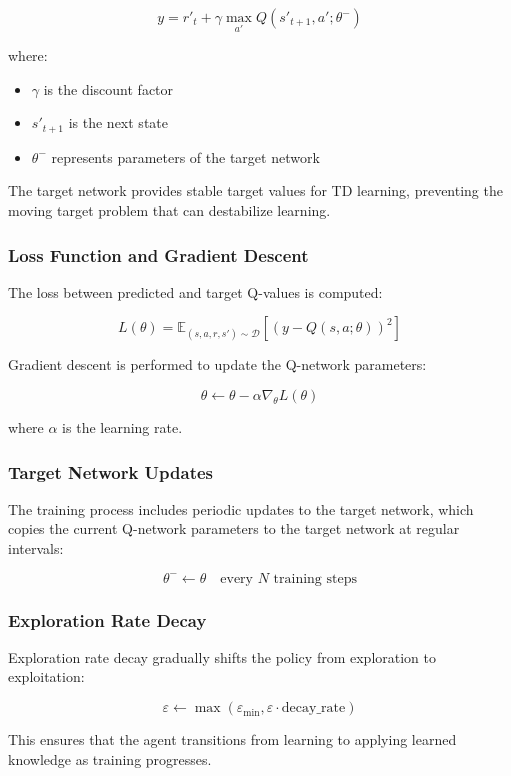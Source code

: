 \documentclass[11pt,a4paper]{article}
\begin{document}
\[
y = r'_t + \gamma \max_{a'} Q(s'_{t+1}, a'; \theta^-)
\]

where:
\begin{itemize}
    \item $\gamma$ is the discount factor
    \item $s'_{t+1}$ is the next state
    \item $\theta^-$ represents parameters of the target network
\end{itemize}

The target network provides stable target values for TD learning, preventing the moving target problem that can destabilize learning.

\subsubsection{Loss Function and Gradient Descent}

The loss between predicted and target Q-values is computed:

\[
L(\theta) = \mathbb{E}_{(s,a,r,s') \sim \mathcal{D}} \left[ \left( y - Q(s, a; \theta) \right)^2 \right]
\]

Gradient descent is performed to update the Q-network parameters:

\[
\theta \leftarrow \theta - \alpha \nabla_\theta L(\theta)
\]

where $\alpha$ is the learning rate.

\subsubsection{Target Network Updates}

The training process includes periodic updates to the target network, which copies the current Q-network parameters to the target network at regular intervals:

\[
\theta^- \leftarrow \theta \quad \text{every } N \text{ training steps}
\]

\subsubsection{Exploration Rate Decay}

Exploration rate decay gradually shifts the policy from exploration to exploitation:

\[
\varepsilon \leftarrow \max(\varepsilon_{\min}, \varepsilon \cdot \text{decay\_rate})
\]

This ensures that the agent transitions from learning to applying learned knowledge as training progresses.
\end{document}
